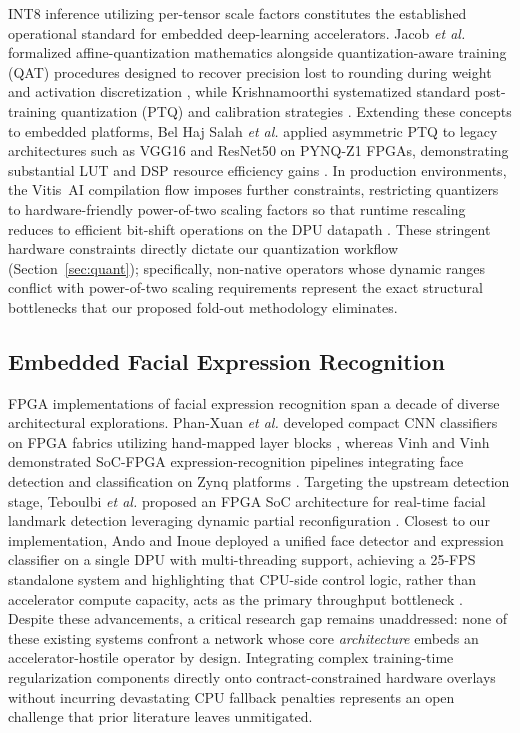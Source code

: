 \documentclass[algorithms,article,submit,moreauthors]{Definitions/mdpi}
\begin{document}
INT8 inference utilizing per-tensor scale factors constitutes the established operational standard for embedded deep-learning accelerators. Jacob \textit{et al.} formalized affine-quantization mathematics alongside quantization-aware training (QAT) procedures designed to recover precision lost to rounding during weight and activation discretization \citep{bib9}, while Krishnamoorthi systematized standard post-training quantization (PTQ) and calibration strategies \citep{bib10}. Extending these concepts to embedded platforms, Bel Haj Salah \textit{et al.} applied asymmetric PTQ to legacy architectures such as VGG16 and ResNet50 on PYNQ-Z1 FPGAs, demonstrating substantial LUT and DSP resource efficiency gains \citep{bib11}. In production environments, the Vitis~AI compilation flow imposes further constraints, restricting quantizers to hardware-friendly power-of-two scaling factors so that runtime rescaling reduces to efficient bit-shift operations on the DPU datapath \citep{bib1}. These stringent hardware constraints directly dictate our quantization workflow (Section~\ref{sec:quant}); specifically, non-native operators whose dynamic ranges conflict with power-of-two scaling requirements represent the exact structural bottlenecks that our proposed fold-out methodology eliminates.

\subsection{Embedded Facial Expression Recognition}

FPGA implementations of facial expression recognition span a decade of diverse architectural explorations. Phan-Xuan \textit{et al.} developed compact CNN classifiers on FPGA fabrics utilizing hand-mapped layer blocks \citep{bib12}, whereas Vinh and Vinh demonstrated SoC-FPGA expression-recognition pipelines integrating face detection and classification on Zynq platforms \citep{bib13}. Targeting the upstream detection stage, Teboulbi \textit{et al.} proposed an FPGA SoC architecture for real-time facial landmark detection leveraging dynamic partial reconfiguration \citep{bib14}. Closest to our implementation, Ando and Inoue deployed a unified face detector and expression classifier on a single DPU with multi-threading support, achieving a 25-FPS standalone system and highlighting that CPU-side control logic, rather than accelerator compute capacity, acts as the primary throughput bottleneck \citep{bib15}. Despite these advancements, a critical research gap remains unaddressed: none of these existing systems confront a network whose core \emph{architecture} embeds an accelerator-hostile operator by design. Integrating complex training-time regularization components directly onto contract-constrained hardware overlays without incurring devastating CPU fallback penalties represents an open challenge that prior literature leaves unmitigated.
\end{document}
